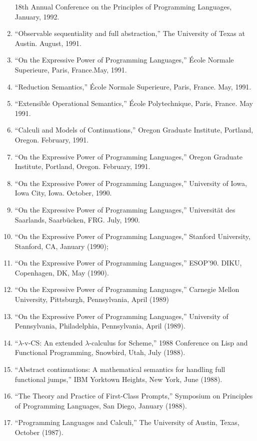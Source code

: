 \begin{enumerate}
18th Annual Conference on the Principles of Programming Languages,
January, 1992.
\item ``Observable sequentiality and full abstraction,'' The
University of Texas at Austin. August, 1991.
\item ``On the Expressive Power of Programming Languages,''
\'Ecole Normale Superieure, Paris, France.May, 1991.
\item ``Reduction Semantics,'' \'Ecole Normale Superieure, Paris,
France. May, 1991. 
\item ``Extensible Operational Semantics,'' \'Ecole Polytechnique,
Paris, France. May 1991. 
\item ``Calculi and Models of Continuations,''
Oregon Graduate Institute, Portland, Oregon. February, 1991.
\item ``On the Expressive Power of Programming Languages,''
Oregon Graduate Institute, Portland, Oregon. February, 1991.
\item ``On the Expressive Power of Programming Languages,''
University of Iowa, Iowa City, Iowa. October, 1990. 
\item ``On the Expressive Power of Programming Languages,''
Universit\"at des Saarlands, Saarb\"ucken, FRG. July, 1990.
\item ``On the Expressive Power of Programming Languages,''
Stanford University, Stanford, CA, January (1990); 
\item ``On the Expressive Power of Programming Languages,''
ESOP'90. DIKU, Copenhagen, DK, May (1990). 
\item ``On the Expressive Power of Programming Languages,''
Carnegie Mellon University, Pittsburgh, Pennsylvania, April (1989)
\item ``On the Expressive Power of Programming Languages,''
University of Pennsylvania, Philadelphia, Pennsylvania, April (1989).
\item ``$\lambda$-v-CS: An extended $\lambda$-calculus for Scheme,''
1988 Conference on Lisp and Functional Programming, Snowbird, Utah,
July (1988).
\item ``Abstract continuations: A mathematical semantics for handling
full functional jumps,'' IBM Yorktown Heights, New York, June (1988).
\item ``The Theory and Practice of First-Class Prompts,'' Symposium
on Principles of Programming Languages, San Diego, January (1988).
\item ``Programming Languages and Calculi,'' The University of Austin,
Texas, October (1987).
\end{enumerate}

